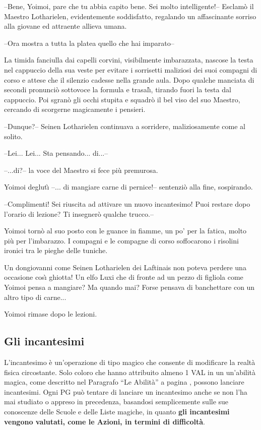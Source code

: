 \iffullversion
\begin{racconto}
  --Bene, Yoimoi, pare che tu abbia capito bene. Sei molto
  intelligente!-- E\-scla\-m\`o il Maestro Lotharielen, evidentemente
  soddisfatto, regalando un affascinante sorriso alla giovane ed
  attraente allieva umana.
  
  --Ora mostra a tutta la platea quello che hai imparato--
  
  La timida fanciulla dai capelli corvini, visibilmente imbarazzata,
  nascose la testa nel cappuccio della sua veste per evitare i
  sorrisetti maliziosi dei suoi compagni di corso e attese che il
  silenzio cadesse nella grande aula. Dopo qualche manciata di secondi
  pronunci\`o sottovoce la formula e trasal\`{\i}, tirando fuori la
  testa dal cappuccio. Poi sgran\`o gli occhi stupita e squadr\`o il
  bel viso del suo Maestro, cercando di scorgerne magicamente i
  pensieri.
  
  --Dunque?-- Seinen Lotharielen continuava a sorridere,
  maliziosamente come al solito.
  
  --Lei... Lei... Sta pensando... di...--

  --...di?-- la voce del Maestro si fece pi\`u premurosa. 
  
  Yoimoi deglut\`{\i} --... di mangiare carne di pernice!--
  sentenzi\`o alla fine, sospirando.
  
  --Complimenti! Sei riuscita ad attivare un nuovo incantesimo! Puoi
  restare dopo l'orario di lezione? Ti insegner\`o qualche trucco.--
  
  Yoimoi torn\`o al suo posto con le guance in fiamme, un po' per la
  fatica, molto pi\`u per l'imbarazzo. I compagni e le compagne di
  corso soffocarono i risolini ironici tra le pieghe delle tuniche.
  
  Un dongiovanni come Seinen Lotharielen dei Laftinais non poteva
  perdere una occasione cos\`{\i} ghiotta! Un elfo Luxi che di fronte
  ad un pezzo di figliola come Yoimoi pensa a mangiare? Ma quando mai?
  Forse pensava di banchettare con un altro tipo di carne...
  
  Yoimoi rimase dopo le lezioni.
\end{racconto}
\fi

\subsection{Gli incantesimi}

L'incantesimo \`e un'operazione di tipo magico che consente di
modificare la realt\`a fisica circostante.  Solo coloro che hanno
attribuito almeno 1 VAL in un un'abilit\`a magica, come descritto
nel Paragrafo ``Le Abilit\`a'' a pagina \pageref{abilita}, possono
lanciare incantesimi. Ogni PG pu\`o tentare di lanciare un
incantesimo anche se non l'ha mai studiato o appreso in precedenza,
basandosi semplicemente sulle sue conoscenze delle Scuole e delle
Liste magiche, in quanto \textbf{gli incantesimi vengono valutati, come le
Azioni, in termini di difficolt\`a}.


